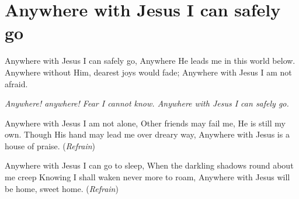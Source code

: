 \chapter{Anywhere with Jesus I can safely go}
\startlines
{\sc Anywhere} with Jesus I can safely go,
    Anywhere He leads me in this world below.
    Anywhere without Him, dearest joys would fade;
    Anywhere with Jesus I am not afraid.

{\it        Anywhere! anywhere! Fear I cannot know.
          Anywhere with Jesus I can safely go.}

    Anywhere with Jesus I am not alone,
    Other friends may fail me, He is still my own.
    Though His hand may lead me over dreary way,
    Anywhere with Jesus is a house of praise.
          \hfill({\it Refrain})~~~~~~~~~

    Anywhere with Jesus I can go to sleep,
    When the darkling shadows round about me creep
    Knowing I shall waken never more to roam,
    Anywhere with Jesus will be home, sweet home.
          \hfill({\it Refrain})~~~~~~~~~
\stoplines


